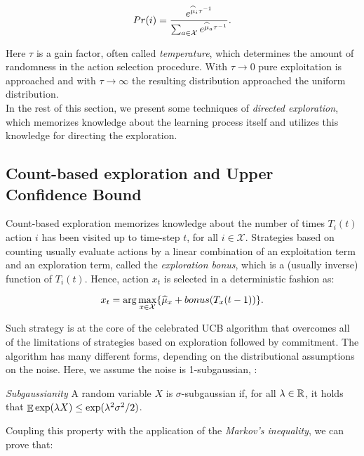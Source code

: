 \begin{equation}
Pr(i) = \frac{e^{\widehat{\mu}_i \tau^{-1}}}{\sum_{a\in\mathcal{X}}e^{\widehat{\mu}_{a}\tau^{-1}}}.
\end{equation}

Here $\tau$ is a gain factor, often called \emph{temperature}, which determines the amount of randomness in the action selection procedure. With $\tau\to 0$ pure exploitation is approached and with $\tau\to \infty$ the resulting distribution approached the uniform distribution. \\
In the rest of this section, we present some techniques of \emph{directed exploration}, which memorizes knowledge about the learning process itself and utilizes this knowledge for directing the exploration.

\subsection{Count-based exploration and Upper Confidence Bound}
Count-based exploration memorizes knowledge about the number of times $T_i(t)$ action $i$ has been visited up to time-step $t$, for all $i\in\mathcal{X}$. Strategies based on counting usually evaluate actions by a linear combination of an exploitation term and an exploration term, called the \emph{exploration bonus}, which is a (usually inverse) function of $T_i(t)$. Hence, action $x_t$ is selected in a deterministic fashion as:

\begin{equation}
x_t = \arg\max_{x\in\mathcal{X}}\{\widehat{\mu}_x + bonus(T_x(t-1))\}.
\end{equation}

Such strategy is at the core of the celebrated \gls{UCB} algorithm \cite{lai1985asymptotically, agrawal1995continuum, auer2002finite} that overcomes all of the limitations of strategies based on exploration followed by commitment. The algorithm has many different forms, depending on the distributional assumptions on the noise. Here, we assume the noise is 1-subgaussian, \ie :

\begin{definition} \label{def:subgaussianity}
\emph{Subgaussianity} A random variable $X$ is $\sigma$-subgaussian if, for all $\lambda\in\mathbb{R}$, it holds that $\mathop{\mathbb{E}}{\exp(\lambda X})\leq\exp(\lambda^2\sigma^2/2)$.
\end{definition}

Coupling this property with the application of the \emph{Markov's inequality}, we can prove that:

